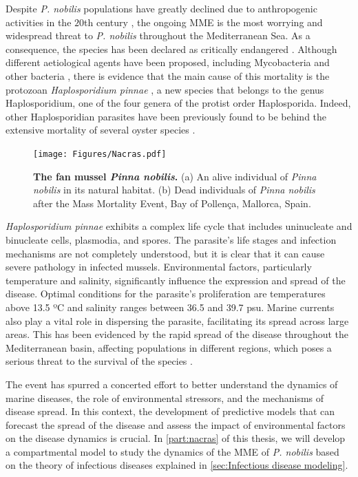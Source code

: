 Despite \textit{P. nobilis} populations have greatly declined due to
anthropogenic activities in the $20$th century \cite{VAZQUEZ2017}, the
ongoing
MME is the most worrying and widespread threat to \textit{P. nobilis}
throughout the Mediterranean Sea. As a consequence, the species has been
declared as critically endangered \cite{IUCN}. Although different
aetiological
agents have been proposed, including Mycobacteria and other bacteria
\cite{Carella2019, Saric2020, Scarpa2020}, there is evidence that the main
cause of this mortality is the protozoan \textit{Haplosporidium pinnae}
\cite{DARRIBA201714, CATANESE20189, Box2020}, a new species that belongs to
the genus Haplosporidium, one of the four genera of the protist order
Haplosporida. Indeed, other Haplosporidian parasites have been previously
found
to be behind the extensive mortality of several oyster species
\cite{Burreson2004, Arzul2015}.

\begin{figure}[H]
  \centering
  \texttt{[image: Figures/Nacras.pdf]}
  \caption[The fan mussel \textit{Pinna nobilis}]{
    \textbf{The fan mussel \textit{Pinna nobilis}.} (a) An alive individual
    of
    \textit{Pinna nobilis} in its natural habitat. (b) Dead individuals of
    \textit{Pinna nobilis} after the Mass Mortality Event, Bay of Pollença,
    Mallorca, Spain.}
  \label{fig:Pinna_nobilis}
\end{figure}

\textit{Haplosporidium pinnae} exhibits a complex life cycle that includes
uninucleate and binucleate cells, plasmodia, and spores. The parasite's life
stages and infection mechanisms are not completely understood, but it is
clear
that it can cause severe pathology in infected mussels. Environmental
factors,
particularly temperature and salinity, significantly influence the expression
and spread of the disease. Optimal conditions for the parasite's
proliferation
are temperatures above 13.5 ºC and salinity ranges between 36.5 and 39.7 psu.
Marine currents also play a vital role in dispersing the parasite,
facilitating
its spread across large areas. This has been evidenced by the rapid spread of
the disease throughout the Mediterranean basin, affecting populations in
different regions, which poses a serious threat to the survival of the
species
\cite{Cabanellas2019}.

The event has spurred a concerted effort to better understand the dynamics of
marine diseases, the role of environmental stressors, and the mechanisms of
disease spread. In this context, the development of predictive models that
can
forecast the spread of the disease and assess the impact of environmental
factors on the disease dynamics is crucial. In \cref{part:nacras} of this
thesis, we will develop a compartmental model to study the dynamics of the MME
of \textit{P. nobilis} based on the theory of infectious diseases explained
in
\cref{sec:Infectious disease modeling}.

